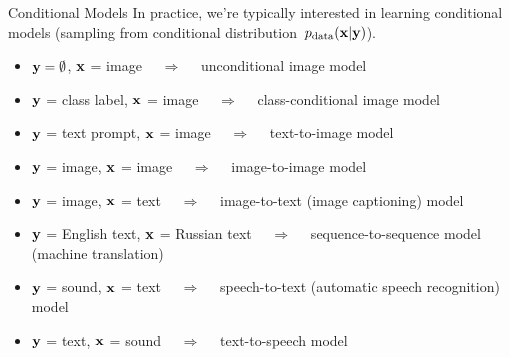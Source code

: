 \documentclass{beamer}
\begin{document}
\begin{frame}{Conditional Models}
	In practice, we're typically interested in learning conditional models (sampling from conditional distribution~$p_{\text{data}}(\mathbf{x} | \mathbf{y})$). 
	\eqpause
	\begin{itemize}
		\item $\mathbf{y} = \emptyset$, $\mathbf{x}$ = image $\quad\Rightarrow\quad$ unconditional image model
		\item $\mathbf{y}$ = class label, $\mathbf{x}$ = image $\quad\Rightarrow\quad$ class-conditional image model
		\item $\mathbf{y}$ = text prompt, $\mathbf{x}$ = image $\quad\Rightarrow\quad$ text-to-image model
		\item $\mathbf{y}$ = image, $\mathbf{x}$ = image $\quad\Rightarrow\quad$ image-to-image model
		\item $\mathbf{y}$ = image, $\mathbf{x}$ = text $\quad\Rightarrow\quad$ image-to-text (image captioning) model
		\item $\mathbf{y}$ = English text, $\mathbf{x}$ = Russian text $\quad\Rightarrow\quad$ sequence-to-sequence model (machine translation)
		\item $\mathbf{y}$ = sound, $\mathbf{x}$ = text $\quad\Rightarrow\quad$ speech-to-text (automatic speech recognition) model
		\item $\mathbf{y}$ = text, $\mathbf{x}$ = sound $\quad\Rightarrow\quad$ text-to-speech model
	\end{itemize}
\end{frame}
\end{document}
